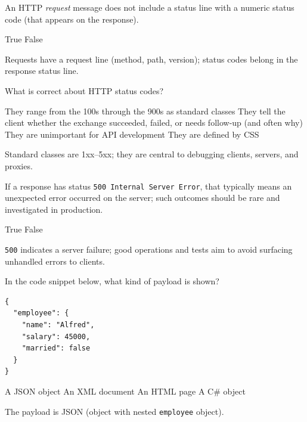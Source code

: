\question[4]
An HTTP \emph{request} message does not include a status line with a numeric status code (that appears on the response).
\begin{choices}
  \CorrectChoice True
  \choice False
\end{choices}
\begin{solution}
  Requests have a request line (method, path, version); status codes belong in the response status line.
\end{solution}


\question[4]
What is correct about HTTP status codes?
\begin{choices}
  \choice They range from the 100s through the 900s as standard classes
  \CorrectChoice They tell the client whether the exchange succeeded, failed, or needs follow-up (and often why)
  \choice They are unimportant for API development
  \choice They are defined by CSS
\end{choices}
\begin{solution}
  Standard classes are 1xx--5xx; they are central to debugging clients, servers, and proxies.
\end{solution}

\question[4]
If a response has status \texttt{500 Internal Server Error}, that typically means an unexpected error occurred on the server; such outcomes should be rare and investigated in production.
\begin{choices}
  \CorrectChoice True
  \choice False
\end{choices}
\begin{solution}
  \texttt{500} indicates a server failure; good operations and tests aim to avoid surfacing unhandled errors to clients.
\end{solution}


\newpage

\question[4]
In the code snippet below, what kind of payload is shown?
\begin{lstlisting}[style=http]
{
  "employee": {
    "name": "Alfred",
    "salary": 45000,
    "married": false
  }
}
\end{lstlisting}
\begin{choices}
  \CorrectChoice A JSON object
  \choice An XML document
  \choice An HTML page
  \choice A C\# object
\end{choices}
\begin{solution}
  The payload is JSON (object with nested \texttt{employee} object).
\end{solution}



